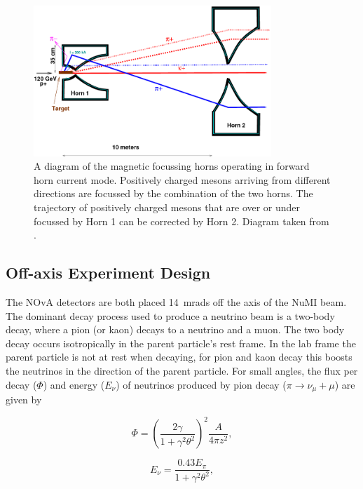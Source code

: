 \begin{figure}
  \centering
  \includegraphics[width=0.8\textwidth]{../../img/beam/images_pion_tracks_in_horn.png}  
  \caption{
    A diagram of the magnetic focussing horns operating in forward
    horn current 
    mode. Positively charged mesons arriving from different directions
    are focussed by the combination of the two horns. The trajectory of
    positively charged mesons that are over or under focussed by Horn
    1 can be corrected by Horn 2. Diagram taken from \cite{NuMI}.
  }
  \label{fig:horn}
\end{figure}


\subsection{Off-axis Experiment Design}

The NOvA detectors are both placed 14~mrads off the axis of the NuMI
beam.
The dominant decay process used to produce a neutrino beam is a
two-body decay, where a
pion (or kaon) decays to a neutrino and a muon. The two body decay 
occurs isotropically in the parent particle's rest frame. 
In the lab frame the parent particle is not at rest when decaying, for
pion and kaon decay this boosts the neutrinos in the
direction of the parent particle.
For small angles, the flux per decay ($\Phi$) and energy ($E_\nu$) of
neutrinos produced by pion decay ($\pi \rightarrow \nu_{\mu} + \mu$)
are given by 

\begin{equation}
\Phi = \left( \dfrac{2\gamma}{1+\gamma^2 \theta^2} \right)^2 \dfrac{A}{4\pi z^2},
\label{eqn:NuPiFlux}
\end{equation}

\begin{equation}
E_{\nu} = \dfrac{0.43E_{\pi}}{1+\gamma^2\theta^2},
\label{eqn:NuPiEnrgy}
\end{equation}

